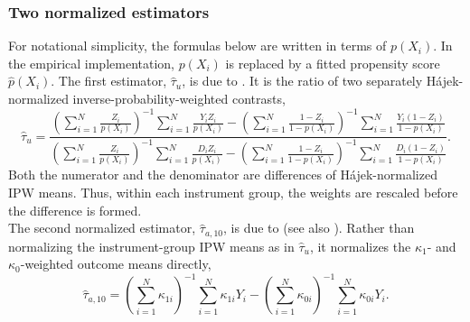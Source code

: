 \documentclass{article}
\begin{document}
\subsubsection*{Two normalized estimators}
For notational simplicity, the formulas below are written in terms of $p(X_i)$. In the empirical implementation, $p(X_i)$ is replaced by a fitted propensity score
$\hat p(X_i)$.
The first estimator, $\hat\tau_u$, is due to \citet{uysal2011three}. It is
the ratio of two separately Hájek-normalized inverse-probability-weighted
contrasts,
\begin{equation}
    \hat\tau_u =
    \frac{
        \left(\sum_{i=1}^N \frac{Z_i}{p(X_i)}\right)^{-1}\sum_{i=1}^N \frac{Y_iZ_i}{p(X_i)}
        -
        \left(\sum_{i=1}^N \frac{1-Z_i}{1-p(X_i)}\right)^{-1}\sum_{i=1}^N \frac{Y_i(1-Z_i)}{1-p(X_i)}
    }{
        \left(\sum_{i=1}^N \frac{Z_i}{p(X_i)}\right)^{-1}\sum_{i=1}^N \frac{D_iZ_i}{p(X_i)}
        -
        \left(\sum_{i=1}^N \frac{1-Z_i}{1-p(X_i)}\right)^{-1}\sum_{i=1}^N \frac{D_i(1-Z_i)}{1-p(X_i)}
    }.
    \label{eq:tau_u}
\end{equation}
Both the numerator and the denominator are differences of Hájek-normalized
IPW means. Thus, within each instrument group, the weights are rescaled before
the difference is formed.\\
The second normalized estimator, $\hat\tau_{a,10}$, is due to
\citet{abadie2018econometric} (see also \citealp{sant2022covariate}). Rather than normalizing the instrument-group IPW means as in \(\hat\tau_u\),
it normalizes the \(\kappa_1\)- and \(\kappa_0\)-weighted outcome means directly,
\begin{equation}
    \hat\tau_{a,10} =
    \left(\sum_{i=1}^N \kappa_{1i}\right)^{-1}\sum_{i=1}^N \kappa_{1i}Y_i
    -
    \left(\sum_{i=1}^N \kappa_{0i}\right)^{-1}\sum_{i=1}^N \kappa_{0i}Y_i.
    \label{eq:tau_a10}
\end{equation}
\end{document}
